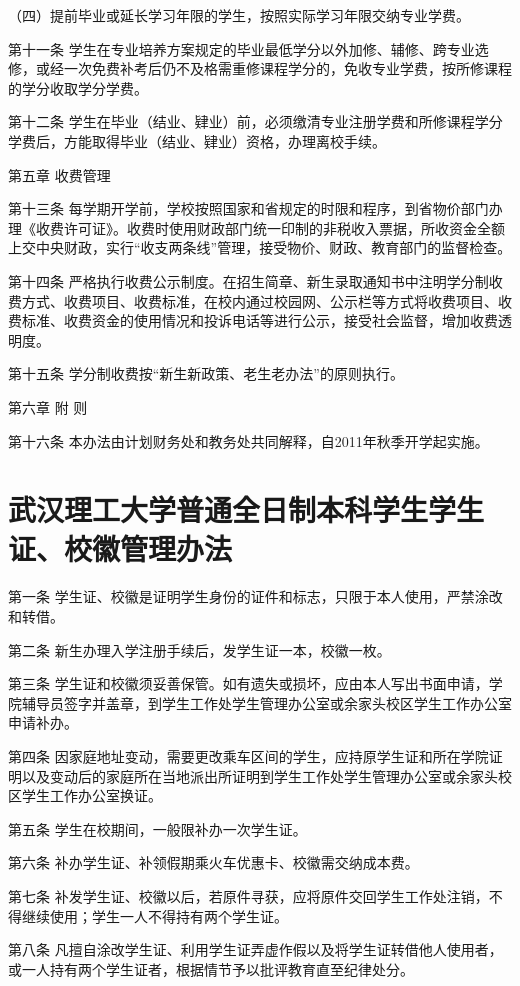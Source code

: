 \documentclass[UTF8,12pt,a4paper]{report}
\begin{document}
（四）提前毕业或延长学习年限的学生，按照实际学习年限交纳专业学费。

第十一条 学生在专业培养方案规定的毕业最低学分以外加修、辅修、跨专业选修，或经一次免费补考后仍不及格需重修课程学分的，免收专业学费，按所修课程的学分收取学分学费。

第十二条 学生在毕业（结业、肄业）前，必须缴清专业注册学费和所修课程学分学费后，方能取得毕业（结业、肄业）资格，办理离校手续。

第五章 收费管理

第十三条 每学期开学前，学校按照国家和省规定的时限和程序，到省物价部门办理《收费许可证》。收费时使用财政部门统一印制的非税收入票据，所收资金全额上交中央财政，实行“收支两条线”管理，接受物价、财政、教育部门的监督检查。

第十四条 严格执行收费公示制度。在招生简章、新生录取通知书中注明学分制收费方式、收费项目、收费标准，在校内通过校园网、公示栏等方式将收费项目、收费标准、收费资金的使用情况和投诉电话等进行公示，接受社会监督，增加收费透明度。

第十五条 学分制收费按“新生新政策、老生老办法”的原则执行。

第六章 附 则

第十六条 本办法由计划财务处和教务处共同解释，自2011年秋季开学起实施。

\chapter{武汉理工大学普通全日制本科学生学生证、校徽管理办法}
第一条 学生证、校徽是证明学生身份的证件和标志，只限于本人使用，严禁涂改和转借。

第二条 新生办理入学注册手续后，发学生证一本，校徽一枚。

第三条 学生证和校徽须妥善保管。如有遗失或损坏，应由本人写出书面申请，学院辅导员签字并盖章，到学生工作处学生管理办公室或余家头校区学生工作办公室申请补办。

第四条 因家庭地址变动，需要更改乘车区间的学生，应持原学生证和所在学院证明以及变动后的家庭所在当地派出所证明到学生工作处学生管理办公室或余家头校区学生工作办公室换证。

第五条 学生在校期间，一般限补办一次学生证。

第六条 补办学生证、补领假期乘火车优惠卡、校徽需交纳成本费。

第七条 补发学生证、校徽以后，若原件寻获，应将原件交回学生工作处注销，不得继续使用；学生一人不得持有两个学生证。

第八条 凡擅自涂改学生证、利用学生证弄虚作假以及将学生证转借他人使用者，或一人持有两个学生证者，根据情节予以批评教育直至纪律处分。
\end{document}
